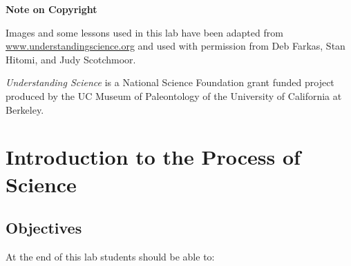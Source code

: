 \documentclass[
]{book}
\begin{document}
\textbf{Note on Copyright}

Images and some lessons used in this lab have been adapted from \href{http://www.understandingscience.org/}{www.understandingscience.org} and used with permission from Deb Farkas, Stan Hitomi, and Judy Scotchmoor.

\emph{Understanding Science} is a National Science Foundation grant funded project produced by the UC Museum of Paleontology of the University of California at Berkeley.

\hypertarget{introduction-to-the-process-of-science}{%
\section*{Introduction to the Process of Science}\label{introduction-to-the-process-of-science}}

\hypertarget{objectives}{%
\subsection*{Objectives}\label{objectives}}

At the end of this lab students should be able to:
\end{document}

